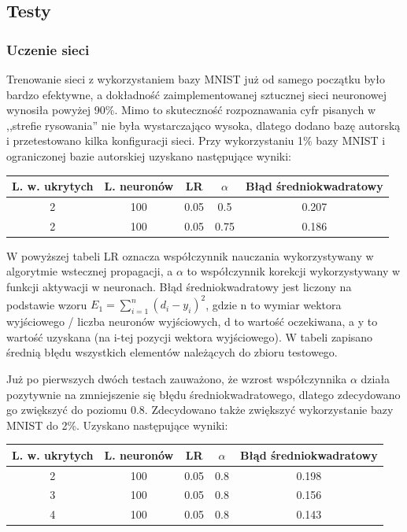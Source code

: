 \documentclass[12pt,a4paper]{article}
\begin{document}
\vspace{20pt}
\subsection*{Testy}
    \subsubsection*{Uczenie sieci}
    \hspace{20pt} Trenowanie sieci z wykorzystaniem bazy MNIST już od samego początku było bardzo efektywne, a dokładność zaimplementowanej sztucznej sieci neuronowej wynosiła powyżej 90\%. Mimo to skuteczność rozpoznawania cyfr pisanych w ,,strefie rysowania'' nie była wystarczająco wysoka, dlatego dodano bazę autorską i przetestowano kilka konfiguracji sieci. Przy wykorzystaniu 1\% bazy MNIST i ograniczonej bazie autorskiej uzyskano następujące wyniki:
    
\begin{center}
 \begin{tabular}{||c c c c c||} 
 \hline
 L. w. ukrytych & L. neuronów & LR & $\alpha$ & Błąd średniokwadratowy \\
 \hline\hline
 2 & 100 & 0.05 & 0.5 & 0.207 \\ 
 \hline
 2 & 100 & 0.05 & 0.75 & 0.186 \\ 
 \hline
\end{tabular}
\end{center}

W powyższej tabeli LR oznacza współczynnik nauczania wykorzystywany w algorytmie wstecznej propagacji, a $\alpha$ to współczynnik korekcji wykorzystywany w funkcji aktywacji w neuronach. Błąd średniokwadratowy jest liczony na podstawie wzoru $E_1 = \sum_{i=1}^{n}(d_{i} - y_{i})^{2}$, gdzie n to wymiar wektora wyjściowego / liczba neuronów wyjściowych, d to wartość oczekiwana, a y to wartość uzyskana (na i-tej pozycji wektora wyjściowego). W tabeli zapisano średnią błędu wszystkich elementów należących do zbioru testowego. 

Już po pierwszych dwóch testach zauważono, że wzrost współczynnika $\alpha$ działa pozytywnie na zmniejszenie się błędu średniokwadratowego, dlatego zdecydowano go zwiększyć do poziomu 0.8. Zdecydowano także zwiększyć wykorzystanie bazy MNIST do 2\%. Uzyskano następujące wyniki:

\begin{center}
 \begin{tabular}{||c c c c c||} 
 \hline
 L. w. ukrytych & L. neuronów & LR & $\alpha$ & Błąd średniokwadratowy \\
 \hline\hline
 2 & 100 & 0.05 & 0.8 & 0.198 \\ 
 \hline
 3 & 100 & 0.05 & 0.8 & 0.156 \\ 
 \hline
 4 & 100 & 0.05 & 0.8 & 0.143 \\ 
 \hline
\end{tabular}
\end{center}
\end{document}
